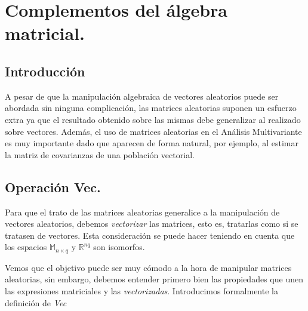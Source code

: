 \documentclass{article}
\theoremstyle{theorem-style}  %
\theoremstyle{definition-style}
\theoremstyle{example-style}
\theoremstyle{exercise-style}
\begin{document}
	
	\maketitle
	
	
	
	\newpage
	\tableofcontents
	\newpage
	
	\section{Complementos del álgebra matricial.}
	
	\subsection{Introducción}
	
	A pesar de que la manipulación algebraica de vectores aleatorios puede ser abordada sin ninguna complicación, las matrices aleatorias suponen un esfuerzo extra ya que el resultado obtenido sobre las mismas debe generalizar al realizado sobre vectores. Además, el uso de matrices aleatorias en el Análisis Multivariante es muy importante dado que aparecen de forma natural, por ejemplo, al estimar la matriz de covarianzas de una población vectorial.
	
	\subsection{Operación Vec.}
	
	Para que el trato de las matrices aleatorias generalice a la manipulación de vectores aleatorios, debemos \textit{vectorizar} las matrices, esto es, tratarlas como si se tratasen de vectores. Esta consideración se puede hacer teniendo en cuenta que los espacios $\mathbb{M}_{n \times q}$ y $\mathbb{R}^{nq}$ son isomorfos. 
	
	Vemos que el objetivo puede ser muy cómodo a la hora de manipular matrices aleatorias, sin embargo, debemos entender primero bien las propiedades que unen las expresiones matriciales y las \textit{vectorizadas}. Introducimos formalmente la definición de \textit{Vec}
	
	\vspace{0.2cm}
	
\end{document}
